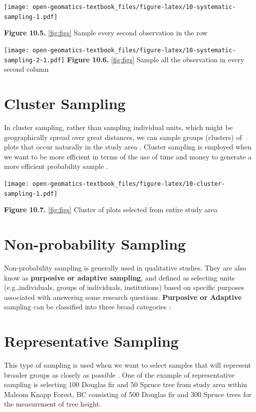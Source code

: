 \documentclass[
]{book}
\begin{document}
\texttt{[image: open-geomatics-textbook\_files/figure-latex/10-systematic-sampling-1.pdf]}

\textbf{Figure 10.5.} \ref{fig:figs} Sample every second observation in the row

\texttt{[image: open-geomatics-textbook\_files/figure-latex/10-systematic-sampling-2-1.pdf]}
\textbf{Figure 10.6.} \ref{fig:figs} Sample all the observation in every second column

\hypertarget{cluster-sampling}{%
\section{Cluster Sampling}\label{cluster-sampling}}

In cluster sampling, rather than sampling individual units, which might be geographically spread over great distances, we can sample groups (clusters) of plots that occur naturally in the study area \citep{Teddlie2007}. Cluster sampling is employed when we want to be more efficient in terms of the use of time and money to generate a more efficient probability sample \citep{Teddlie2007}.

\texttt{[image: open-geomatics-textbook\_files/figure-latex/10-cluster-sampling-1.pdf]}

\textbf{Figure 10.7.} \ref{fig:figs} Cluster of plots selected from entire study area

\hypertarget{non-probability-sampling}{%
\section{Non-probability Sampling}\label{non-probability-sampling}}

Non-probability sampling is generally used in qualitative studies. They are also know as \textbf{purposive or adaptive sampling}, and defined as selecting units (e.g.,individuals, groups of individuals, institutions) based on specific purposes associated with answering some research questions. \textbf{Purposive or Adaptive} sampling can be classified into three broad categories \citep{Teddlie2007}:

\hypertarget{representative-sampling}{%
\section{Representative Sampling}\label{representative-sampling}}

This type of sampling is used when we want to select samples that will represent broader groups as closely as possible \citep{Teddlie2007}. One of the example of representative sampling is selecting 100 Douglas fir and 50 Spruce tree from study area within Malcom Knapp Forest, BC consisting of 500 Douglas fir and 300 Spruce trees for the measurement of tree height.
\end{document}
